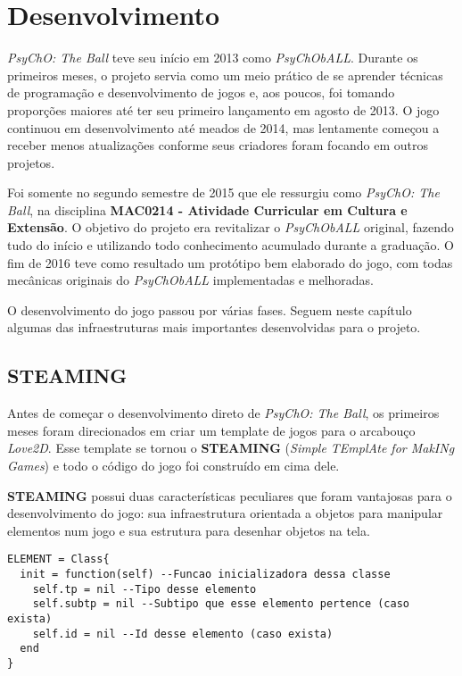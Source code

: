 \chapter{Desenvolvimento}
\label{cap:desenvolvimento}

\textit{PsyChO: The Ball} teve seu início em 2013 como \textit{PsyChObALL}. Durante os primeiros meses, o projeto servia como um meio prático de se aprender técnicas de programação e desenvolvimento de jogos e, aos poucos, foi tomando proporções maiores até ter seu primeiro lançamento em agosto de 2013. O jogo continuou em desenvolvimento até meados de 2014, mas lentamente começou a receber menos atualizações conforme seus criadores foram focando em outros projetos.

Foi somente no segundo semestre de 2015 que ele ressurgiu como \textit{PsyChO: The Ball}, na disciplina \textbf{MAC0214 - Atividade Curricular em Cultura e Extensão}. O objetivo do projeto era revitalizar o \textit{PsyChObALL} original, fazendo tudo do início e utilizando todo conhecimento acumulado durante a graduação. O fim de 2016 teve como resultado um protótipo bem elaborado do jogo, com todas mecânicas originais do \textit{PsyChObALL} implementadas e melhoradas.

O desenvolvimento do jogo passou por várias fases. Seguem neste capítulo algumas das infraestruturas mais importantes desenvolvidas para o projeto.

\section{STEAMING}
\label{sec:steaming}

Antes de começar o desenvolvimento direto de \textit{PsyChO: The Ball}, os primeiros meses foram direcionados em criar um template de jogos para o arcabouço \textit{Love2D}. Esse template se tornou o \textbf{STEAMING} (\textit{Simple TEmplAte for MakINg Games}) e todo o código do jogo foi construído em cima dele.

\textbf{STEAMING} possui duas características peculiares que foram vantajosas para o desenvolvimento do jogo: sua infraestrutura orientada a objetos para manipular elementos num jogo e sua estrutura para desenhar objetos na tela.

\begin{lstlisting}[language={[5.0]lua}]
ELEMENT = Class{
  init = function(self) --Funcao inicializadora dessa classe
    self.tp = nil --Tipo desse elemento
    self.subtp = nil --Subtipo que esse elemento pertence (caso exista)
    self.id = nil --Id desse elemento (caso exista)
  end
}
\end{lstlisting}

